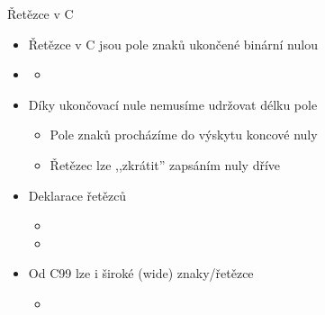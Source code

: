 \begin{frame}{Řetězce v C}

  \begin{itemize}
    \item Řetězce v C jsou pole znaků ukončené binární nulou

    \pause

    \item {}
    \begin{itemize}
      \item {}
    \end{itemize}

    \pause

    \item Díky ukončovací nule nemusíme udržovat délku pole
    \begin{itemize}
      \item Pole znaků procházíme do výskytu koncové nuly
      \item Řetězec lze ,,zkrátit'' zapsáním nuly dříve
    \end{itemize}

    \pause

    \item Deklarace řetězců
    \begin{itemize}
      \item {}
      \item {}
    \end{itemize}

    \pause

    \item Od C99 lze i široké (wide) znaky/řetězce
    \begin{itemize}
      \item {}
    \end{itemize}

  \end{itemize}

\end{frame}

